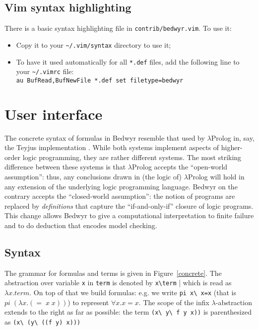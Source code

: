 \documentclass{article}
\begin{document}
\subsection{Vim syntax highlighting}

There is a basic syntax highlighting file in \verb;contrib/bedwyr.vim;.
To use it:
\begin{itemize}
\item
Copy it to your \verb|~/.vim/syntax| directory to use it;
\item
To have it used automatically for all \verb|*.def| files, add the
following line to your \verb;~/.vimrc; file:\\
\verb|au BufRead,BufNewFile *.def set filetype=bedwyr|
\end{itemize}


\section{User interface}
\label{sec:interface}

The concrete syntax of formulas in Bedwyr resemble that used by
$\lambda$Prolog in, say, the Teyjus implementation
\cite{nadathur99cade}.  While both systems implement aspects of
higher-order logic programming, they are rather different systems.
The most striking difference between these systems is that
$\lambda$Prolog accepts the ``open-world assumption'': thus, any
conclusions drawn in (the logic of) $\lambda$Prolog will hold in any
extension of the underlying logic programming language.  Bedwyr on the
contrary accepts the ``closed-world assumption'': the notion of
programs are replaced by {\em definitions} that capture the
``if-and-only-if'' closure of logic programs.  This change allows
Bedwyr to give a computational interpretation to finite failure and
to do deduction that encodes model checking.

\subsection{Syntax}

The grammar for formulas and terms is given in Figure~\ref{concrete}.
The abstraction over variable \verb.x. in \verb.term. is denoted by
\verb.x\term. | which is read as $\lambda x. term$. On top of that we
build formulas: e.g. we write \verb.pi x\ x=x.  (that is
$pi\;(\lambda{}x.(=\;x\;x))$) to represent $\forall x. x=x$.  The
scope of the infix $\lambda$-abstraction extends to the right as far
as possible: the term \verb.(x\ y\ f y x)). is parenthesized as 
\verb.(x\ (y\ ((f y) x))).
\end{document}
